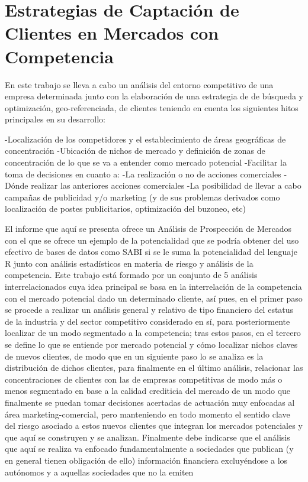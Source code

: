 \chapter{Estrategias de Captación de Clientes en Mercados con Competencia}




En este trabajo se lleva a cabo un análisis del entorno competitivo de una empresa determinada junto con la elaboración de una estrategia de de búsqueda y optimización, geo-referenciada, de clientes teniendo en cuenta los siguientes hitos principales en su desarrollo:

-Localización de los competidores y el establecimiento de áreas geográficas de concentración
-Ubicación de nichos de mercado y definición de zonas de concentración de lo que se va a entender como mercado potencial
	    -Facilitar la toma de decisiones en cuanto a: 
		    -La realización o no de acciones comerciales
	 	    -Dónde realizar las anteriores acciones comerciales
    -La posibilidad de llevar a cabo campañas de publicidad y/o marketing (y de sus problemas derivados como localización de postes publicitarios, optimización del buzoneo, etc)

    El informe que aquí se presenta ofrece un Análisis de Prospección de Mercados con el que se ofrece un ejemplo de la potencialidad que se podría obtener del uso efectivo de bases de datos como SABI si se le suma la potencialidad del lenguaje R junto con análisis estadísticos en materia de riesgo y análisis de la competencia.
    Este trabajo está formado por un conjunto de 5 análisis interrelacionados cuya idea principal se basa en la interrelación de la competencia con el mercado potencial dado un determinado cliente, así pues, en el primer paso se procede a realizar un análisis general y relativo de tipo financiero del estatus de la industria y del sector competitivo considerado en sí, para posteriormente localizar de un modo segmentado a la competencia; tras estos pasos, en el tercero se define lo que se entiende por mercado potencial y cómo localizar nichos claves de nuevos clientes, de modo que en un siguiente paso lo se analiza es la distribución de dichos clientes, para finalmente en el último análisis, relacionar las concentraciones de clientes con las de empresas competitivas de modo más o menos segmentado en base a la calidad crediticia del mercado de un modo que finalmente se puedan tomar decisiones acertadas de actuación muy enfocadas al área marketing-comercial, pero manteniendo en todo momento el sentido clave del riesgo asociado a estos nuevos clientes que integran los mercados potenciales y que aquí se construyen y se analizan.
    Finalmente debe indicarse que el análisis que aquí se realiza va enfocado fundamentalmente a sociedades que publican (y en general tienen obligación de ello) información financiera excluyéndose a los autónomos y a aquellas sociedades que no la emiten

%

%
